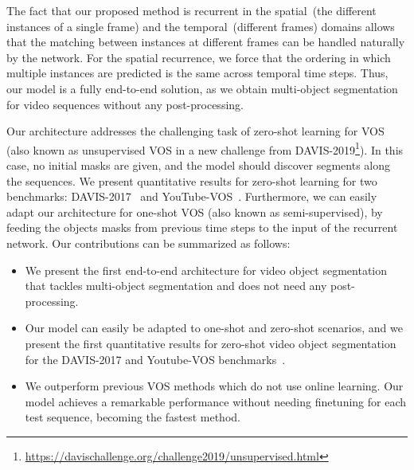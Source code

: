 \documentclass[10pt,twocolumn,letterpaper]{article}
\begin{document}
The fact that our proposed method is recurrent in the spatial~(the different instances of a single frame) and the temporal~(different frames) domains allows that the matching between instances at different frames can be handled naturally by the network. For the spatial recurrence, we force that the ordering in which multiple instances are predicted is the same across temporal time steps. Thus, our model is a fully end-to-end solution, as we obtain multi-object segmentation for video sequences without any post-processing. 



Our architecture addresses the challenging task of zero-shot learning for VOS (also known as unsupervised VOS in a new challenge from DAVIS-2019\footnote{{\href{https://davischallenge.org/challenge2019/unsupervised.html}{https://davischallenge.org/challenge2019/unsupervised.html}}}). In this case, no initial masks are given, and the model should discover segments along the sequences. We present quantitative results for zero-shot learning for two  benchmarks: DAVIS-2017~\cite{Pont-Tuset_arXiv_2017} and YouTube-VOS~\cite{xu2018youtube-benchmark}. Furthermore, we can easily adapt our architecture for one-shot VOS (also known as semi-supervised), by feeding the objects masks from previous time steps to the input of the recurrent network. 
Our contributions can be summarized as follows: 
\begin{itemize}
    \item We present the first end-to-end architecture for video object segmentation that tackles multi-object segmentation and does not need any post-processing.
    \item Our model can easily be adapted to one-shot and zero-shot scenarios, and we present the first quantitative results for zero-shot video object segmentation for the DAVIS-2017 and Youtube-VOS benchmarks~\cite{Pont-Tuset_arXiv_2017, xu2018youtube-benchmark}.
    \item We outperform previous VOS methods which do not use online learning. Our model achieves a remarkable performance without needing finetuning for each test sequence,  becoming the fastest method.
\end{itemize}
\end{document}
